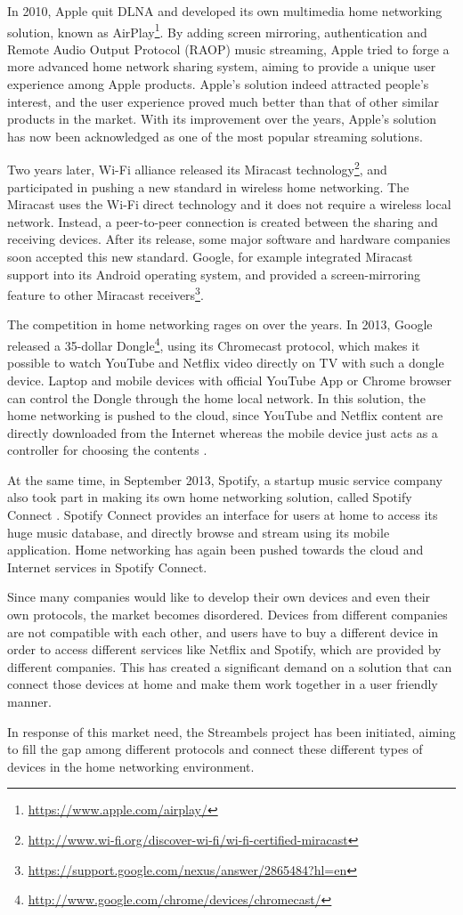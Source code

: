 In 2010, Apple quit DLNA and developed its own multimedia home networking 
solution, known as AirPlay\footnote{\url{https://www.apple.com/airplay/}}. By
adding screen mirroring, authentication and Remote Audio Output Protocol (RAOP)
music streaming, Apple tried to forge a more advanced home network sharing
system, aiming to provide a unique user experience among Apple products.
Apple's solution indeed attracted people's interest, and the user experience
proved much better than that of other similar products in the market. With its
improvement over the years,  Apple's solution has now been acknowledged as one
of the most popular streaming solutions.

Two years later, Wi-Fi alliance released its Miracast
technology\footnote{\url{http://www.wi-fi.org/discover-wi-fi/wi-fi-certified-miracast}},
and participated in pushing a new standard in wireless home networking. The
Miracast uses the Wi-Fi direct technology \cite{miracast_consumer} and it does
not require a wireless local network. Instead, a peer-to-peer connection is
created between the sharing and receiving devices. After its release, some
major software and hardware companies soon accepted this new standard. Google,
for example integrated Miracast support into its Android operating system, and
provided a screen-mirroring feature to other Miracast
receivers\footnote{\url{https://support.google.com/nexus/answer/2865484?hl=en}}.

The competition in home networking rages on over the years. In 2013, Google
released a 35-dollar
Dongle\footnote{\url{http://www.google.com/chrome/devices/chromecast/}}, using
its Chromecast protocol, which makes it possible to watch YouTube and Netflix
video directly on TV with such a dongle device. Laptop and mobile devices with
official YouTube App or Chrome browser can control the Dongle through the home
local network. In this solution, the home networking is pushed to the cloud,
since YouTube and Netflix content are directly downloaded from the Internet
whereas the mobile device just acts as a controller for choosing the
contents \cite{dial}.

At the same time, in September 2013, Spotify, a startup music service 
company also took part in making its own home networking solution, called 
Spotify Connect \cite{spotifyconnect}. Spotify Connect provides an interface for
users at home to access its huge music database, and directly browse and stream
using its mobile application. Home networking has again been pushed towards the
cloud and Internet services in Spotify Connect.

Since many companies would like to develop their own devices and even their 
own protocols, the market becomes disordered. Devices from different companies
are not compatible with each other, and users have to buy a different device in
order to access different services like Netflix and Spotify, which are provided
by different companies. This has created a significant demand on a solution that
can connect those devices at home and make them work together in a user friendly manner.

In response of this market need, the Streambels project has been initiated,
aiming to fill the gap among different protocols and connect these different
types of devices in the home networking environment.

